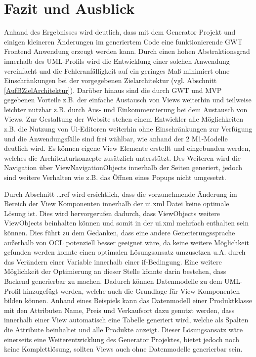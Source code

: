 \chapter{Fazit und Ausblick}
\label{FazitAusblick}
Anhand des Ergebnisses wird deutlich, dass mit dem Generator Projekt und einigen
kleineren Änderungen im generiertem Code eine funktionierende GWT Frontend
Anwendung erzeugt werden kann. Durch einen
hohen Abstraktionsgrad innerhalb des UML-Profils wird die Entwicklung einer solchen Anwendung 
vereinfacht und die Fehleranfälligkeit auf ein geringes Maß minimiert ohne
Einschränkungen bei der vorgegebenen Zielarchitektur (vgl. Abschnitt
\ref{AufBZielArchitektur}).
Darüber hinaus sind die durch GWT und MVP gegebenen Vorteile z.B. der
einfache Austausch von Views weiterhin und teilweise leichter nutzbar z.B.
durch Aus- und Einkommentierung bei dem Austausch von Views. Zur Gestaltung der
Website stehen einem Entwickler alle Möglichkeiten z.B. die
Nutzung von Ui-Editoren weiterhin ohne Einschränkungen zur Verfügung und die
Anwendungsfälle sind frei wählbar, wie anhand der 2 M1-Modelle deutlich wird.
Es können eigene View Elemente erstellt und eingebunden werden, welches die
Architekturkonzepte zusätzlich unterstützt. Des Weiteren wird die Navigation
über ViewNavigationObjects innerhalb der Seiten generiert, jedoch sind weitere
Verhalten wie z.B. das Öffnen eines Popups nicht umgesetzt.

Durch Abschnitt \ldots ref wird ersichtlich, dass die vorzunehmende Änderung im
Bereich der View Komponenten innerhalb der ui.xml Datei keine optimale Lösung ist. Dies wird hervorgerufen
dadurch, dass ViewObjects weitere ViewObjects beinhalten können und somit in der
ui.xml mehrfach enthalten sein können. Dies führt zu dem Gedanken, dass eine
andere Generierungssprache außerhalb von OCL potenziell besser geeignet wäre, da
keine weitere Möglichkeit gefunden werden konnte einen optimalen Lösungsansatz
umzusetzen u.A. durch das Verändern einer Variable innerhalb einer if-Bedingung.
Eine weitere Möglichkeit der Optimierung an dieser Stelle könnte darin bestehen,
dass Backend generierbar zu machen. Dadurch können Datenmodelle zu dem
UML-Profil hinzugefügt werden, welche auch die Grundlage für View Komponenten
bilden können. Anhand eines
Beispiels kann das Datenmodell einer Produktklasse mit den Attributen Name,
Preis und Verkaufsort dazu genutzt werden, dass innerhalb einer View automatisch
eine Tabelle generiert wird, welche als Spalten die Attribute beinhaltet und
alle Produkte anzeigt. Dieser Lösungsansatz wäre einerseits eine
Weiterentwicklung des Generator Projektes, bietet jedoch noch keine
Komplettlösung, sollten Views auch ohne Datenmodelle generierbar sein.

